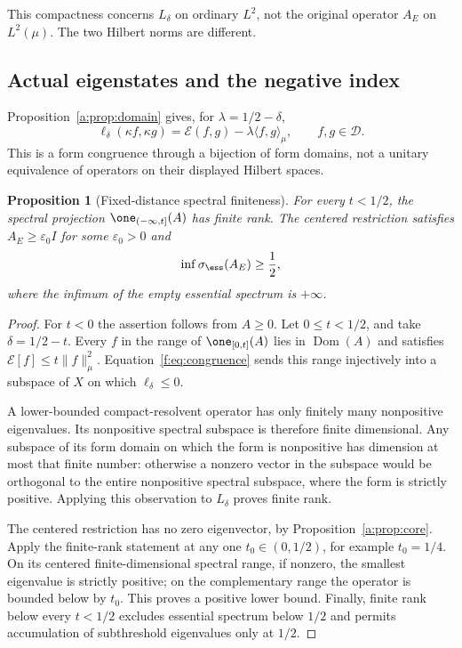 \documentclass[11pt,a4paper]{article}
\numberwithin{equation}{section}
\newtheorem{proposition}[theorem]{Proposition}
\theoremstyle{definition}\newtheorem{definition}[theorem]{Definition}
\theoremstyle{remark}\newtheorem{remark}[theorem]{Remark}
\newcommand{\E}{\mathcal E}\newcommand{\D}{\mathcal D}
\newcommand{\dom}{\operatorname{Dom}}\newcommand{\Var}{\operatorname{Var}}
\newcommand{\ip}[2]{\langle#1,#2\rangle}\newcommand{\norm}[1]{\lVert#1\rVert}\newcommand{\abs}[1]{\lvert#1\rvert}
\begin{document}
This compactness concerns $L_\delta$ on ordinary $L^2$, not the original operator $A_E$ on $L^2(\mu)$. The two Hilbert norms are different.


\subsection{Actual eigenstates and the negative index}\label{f:sec:spectrum}

Proposition~\ref{a:prop:domain} gives, for $\lambda=1/2-\delta$,
\begin{equation}\label{f:eq:congruence}
 \ell_\delta(\kappa f,\kappa g)
       =\E(f,g)-\lambda\ip{f}{g}_\mu,
       \qquad f,g\in\D.
\end{equation}
This is a form congruence through a bijection of form domains, not a unitary equivalence of operators on their displayed Hilbert spaces.

\begin{proposition}[Fixed-distance spectral finiteness]\label{f:prop:finite}
For every $t<1/2$, the spectral projection $\one_{(-\infty,t]}(A)$ has finite rank. The centered restriction satisfies $A_E\ge\varepsilon_0 I$ for some $\varepsilon_0>0$ and
\begin{equation}\label{f:eq:essential}
 \inf\sigma_{\ess}(A_E)\ge\frac12,
\end{equation}
where the infimum of the empty essential spectrum is $+\infty$.
\end{proposition}
\begin{proof}
For $t<0$ the assertion follows from $A\ge0$. Let $0\le t<1/2$, and take $\delta=1/2-t$. Every $f$ in the range of $\one_{[0,t]}(A)$ lies in $\dom(A)$ and satisfies $\E[f]\le t\norm{f}_\mu^2$. Equation~\eqref{f:eq:congruence} sends this range injectively into a subspace of $X$ on which $\ell_\delta\le0$.

A lower-bounded compact-resolvent operator has only finitely many nonpositive eigenvalues. Its nonpositive spectral subspace is therefore finite dimensional. Any subspace of its form domain on which the form is nonpositive has dimension at most that finite number: otherwise a nonzero vector in the subspace would be orthogonal to the entire nonpositive spectral subspace, where the form is strictly positive. Applying this observation to $L_\delta$ proves finite rank.

The centered restriction has no zero eigenvector, by Proposition~\ref{a:prop:core}. Apply the finite-rank statement at any one $t_0\in(0,1/2)$, for example $t_0=1/4$. On its centered finite-dimensional spectral range, if nonzero, the smallest eigenvalue is strictly positive; on the complementary range the operator is bounded below by $t_0$. This proves a positive lower bound. Finally, finite rank below every $t<1/2$ excludes essential spectrum below $1/2$ and permits accumulation of subthreshold eigenvalues only at $1/2$.
\end{proof}
\end{document}
